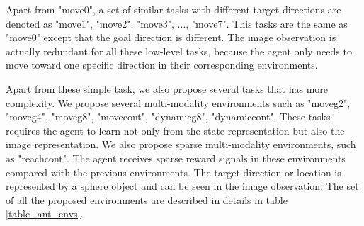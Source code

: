 Apart from "move0", a set of similar tasks with different target directions are denoted as "move1", "move2", "move3", ..., "move7". This tasks are the same as "move0" except that the goal direction is different. The image observation is actually redundant for all these low-level tasks, because the agent only needs to move toward one specific direction in their corresponding environments.

Apart from these simple task, we also propose several tasks that has more complexity. We propose several multi-modality environments such as "moveg2", "moveg4", "moveg8", "movecont", "dynamicg8", "dynamiccont". These tasks requires the agent to learn not only from the state representation but also the image representation. We also propose sparse multi-modality environments, such as "reachcont". The agent receives sparse reward signals in these environments compared with the previous environments. The target direction or location is represented by a sphere object and can be seen in the image observation.
The set of all the proposed environments are described in details in table \ref{table_ant_envs}.


